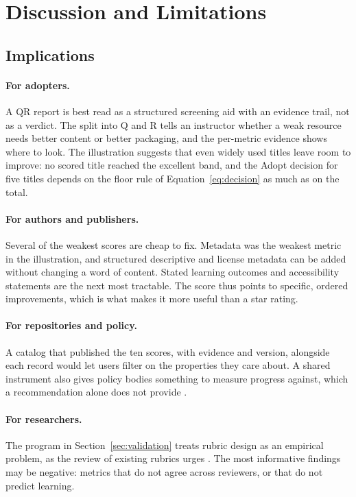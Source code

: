 \section{Discussion and Limitations}
\label{sec:discussion}

\subsection{Implications}
\paragraph{For adopters.} A QR report is best read as a structured screening aid with an evidence trail, not as a verdict. The split into Q and R tells an instructor whether a weak resource needs better content or better packaging, and the per-metric evidence shows where to look. The illustration suggests that even widely used titles leave room to improve: no scored title reached the excellent band, and the Adopt decision for five titles depends on the floor rule of Equation~\ref{eq:decision} as much as on the total.

\paragraph{For authors and publishers.} Several of the weakest scores are cheap to fix. Metadata was the weakest metric in the illustration, and structured descriptive and license metadata can be added without changing a word of content. Stated learning outcomes and accessibility statements are the next most tractable. The score thus points to specific, ordered improvements, which is what makes it more useful than a star rating.

\paragraph{For repositories and policy.} A catalog that published the ten scores, with evidence and version, alongside each record would let users filter on the properties they care about. A shared instrument also gives policy bodies something to measure progress against, which a recommendation alone does not provide \cite{unesco2019}.

\paragraph{For researchers.} The program in Section~\ref{sec:validation} treats rubric design as an empirical problem, as the review of existing rubrics urges \cite{yuan2015}. The most informative findings may be negative: metrics that do not agree across reviewers, or that do not predict learning.

